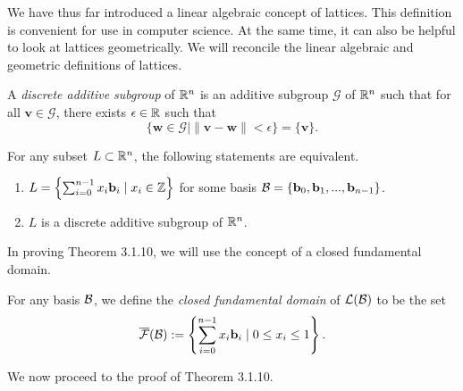 \documentclass[a4paper,12pt]{article}
\begin{document}
We have thus far introduced a linear algebraic concept of lattices. This definition is convenient for use in computer science. At the same time, it can also be helpful to look at lattices geometrically. We will reconcile the linear algebraic and geometric definitions of lattices.

\begin{defn}\label{second def of lattices}
    A \textit{discrete additive subgroup} of $\mathbb{R}^n$ is an additive subgroup $\mathcal{G}$ of $\mathbb{R}^n$ such that for all $\mathbf{v} \in \mathcal{G}$, there exists $\epsilon \in \mathbb{R}$ such that 
    $$\lbrace \mathbf{w} \in \mathcal{G} \mid \|\mathbf{v} - \mathbf{w}\| < \epsilon \rbrace = \lbrace \mathbf{v} \rbrace.$$
\end{defn}

\begin{thm} \label{equivalent definitions}
For any subset $L \subset \mathbb{R}^n$, the following statements are equivalent.
\begin{enumerate}
    \item $L = \left\{ \sum_{i=0}^{n-1} x_{i}\mathbf{b}_{i} \mid x_{i} \in \mathbb{Z} \right\}$ for some basis $\mathcal{B} = \lbrace\mathbf{b}_0, \mathbf{b}_1, ..., \mathbf{b}_{n-1}\rbrace$.
    \item $L$ is a discrete additive subgroup of $\mathbb{R}^n$.
\end{enumerate}

\end{thm}

In proving Theorem 3.1.10, we will use the concept of a closed fundamental domain.

\begin{defn}\label{closed fd}
    For any basis $\mathcal{B}$, we define the \textit{closed fundamental domain} of $\mathcal{L}(\mathcal{B})$ to be the set $$\overline{\mathcal{F}}(\mathcal{B}) := \left\{ \sum_{i=0}^{n-1} x_{i}\mathbf{b}_{i} \mid 0 \leq x_{i} \leq 1 \right\}.$$
\end{defn}

We now proceed to the proof of Theorem 3.1.10.
\end{document}
